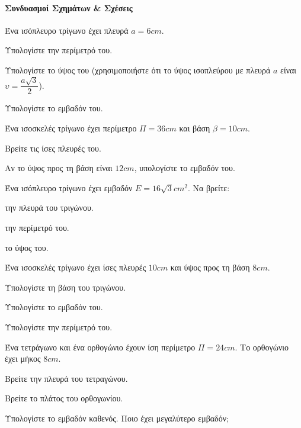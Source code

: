 \documentclass[11pt,a4paper,modern]{FFExercises}
\begin{document}

\paragraph{Συνδυασμοί Σχημάτων \& Σχέσεις}

\askhsh Ένα ισόπλευρο τρίγωνο έχει πλευρά $a=6\si{cm}$.
\begin{alist}
\item Υπολογίστε την περίμετρό του.
\item Υπολογίστε το ύψος του (χρησιμοποιήστε ότι το ύψος ισοπλεύρου με πλευρά $a$ είναι $\upsilon=\dfrac{a\sqrt{3}}{2}$).
\item Υπολογίστε το εμβαδόν του.
\end{alist}

\askhsh Ένα ισοσκελές τρίγωνο έχει περίμετρο $\Pi=36\si{cm}$ και βάση $\beta=10\si{cm}$.
\begin{alist}
\item Βρείτε τις ίσες πλευρές του.
\item Αν το ύψος προς τη βάση είναι $12\si{cm}$, υπολογίστε το εμβαδόν του.
\end{alist}

\askhsh Ένα ισόπλευρο τρίγωνο έχει εμβαδόν $E=16\sqrt{3}\si{cm^2}$. Να βρείτε:
\begin{alist}
\item την πλευρά του τριγώνου.
\item την περίμετρό του.
\item το ύψος του.
\end{alist}

\askhsh Ένα ισοσκελές τρίγωνο έχει ίσες πλευρές $10\si{cm}$ και ύψος προς τη βάση $8\si{cm}$.
\begin{alist}
\item Υπολογίστε τη βάση του τριγώνου.
\item Υπολογίστε το εμβαδόν του.
\item Υπολογίστε την περίμετρό του.
\end{alist}

\askhsh Ένα τετράγωνο και ένα ορθογώνιο έχουν ίση περίμετρο $\Pi=24\si{cm}$. Το ορθογώνιο έχει μήκος $8\si{cm}$.
\begin{alist}
\item Βρείτε την πλευρά του τετραγώνου.
\item Βρείτε το πλάτος του ορθογωνίου.
\item Υπολογίστε το εμβαδόν καθενός. Ποιο έχει μεγαλύτερο εμβαδόν;
\end{alist}
\end{document}
